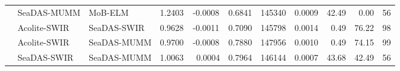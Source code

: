 \documentclass[draft]{spie}  %
\begin{document}
\begin{table}[!ht]
\begin{tabular}{cllcccccccc}
	 		&   SeaDAS-MUMM   &  MoB-ELM      &	1.2403 	&	-0.0008 &	0.6841 	&	145340  &	0.0009  &  42.49    	& ~0.00      		   &   56   	 \\ 
	 		&   Acolite-SWIR  &  SeaDAS-SWIR  &	0.9628 	&	-0.0011 &	0.7090 	&	145798  &	0.0014  &  ~0.49     	& 76.22     		   &   98   	 \\
	 		&   Acolite-SWIR  &  SeaDAS-MUMM  &	0.9700 	&	-0.0008 &	0.7880 	&	147956  &	0.0010  &  ~0.49     	& 74.15     		   &   99   	 \\
	 		&   SeaDAS-SWIR   &  SeaDAS-MUMM  &	1.0063 	&	~0.0004 &	0.7964 	&	146144  &	0.0007  &  43.68    	& 42.49     		   &   56   	 \\
 \end{tabular}
\end{table}
\end{document}

